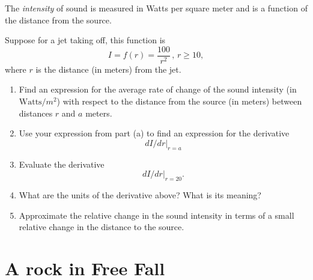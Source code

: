 \documentclass{ximera}
\begin{document}
\begin{question}  \label{Qdfdgt446666}
The \emph{intensity} of sound is measured in Watts per square meter and is a function of the distance from the source. 

Suppose for a jet taking off, this function is
\[
          I = f(r) = \frac{100}{r^2} \, , \, r\geq 10 ,
\]
where $r$ is the distance (in meters) from the jet.    %

\begin{enumerate}

\item Find an expression for the average rate of change of the sound intensity (in $\text{Watts}/m^2$) with respect to the distance from the source (in meters) between distances $r$ and $a$ meters.

\item Use your expression from part (a) to find an expression for the derivative 
\[
   dI/dr \Big|_{r=a} 
\]

\item Evaluate the derivative
\[
       dI/dr \Big|_{r=20} .
\]

\item What are the units of the derivative above? What is its meaning?

\item Approximate the relative change in the sound intensity in terms of a small relative change in the distance to the source.
\end{enumerate}

\end{question}

\section{A rock in Free Fall}
\end{document}
